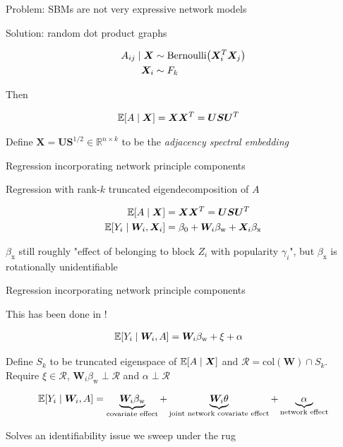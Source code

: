 \documentclass{beamer}
\theoremstyle{remark}
\newcommand{\X}{\bm X}
\newcommand{\W}{\bm W}
\newcommand{\Spop}{\bm S}
\newcommand{\Upop}{\bm U}
\newcommand{\betazero}{\beta_0}
\newcommand \cond {\mid}
\newcommand \dist {\sim}
\DeclarePairedDelimiter{\paren}{(}{)}
\DeclarePairedDelimiter{\brac}{[}{]}
\newcommand{\E}[2][]{%
   \ifthenelse{ \equal{#1}{} }
      {\ensuremath{\mathbb{E} \brac*{#2}}}
      {\ensuremath{\mathbb{E} \brac*{#2 \mid #1}}}
}
\begin{document}
\begin{frame}{Problem: SBMs are not very expressive network models}

    Solution: random dot product graphs

    \begin{align*}
        A_{ij} \cond \X & \dist \mathrm{Bernoulli} \paren*{\X_i^T \X_j} \\
        \X_i            & \dist F_k
    \end{align*}

    Then

    \begin{align*}
        \E[\X]{A} & = \X \X^T = \Upop \Spop \Upop^T
    \end{align*}

    Define $\X = \Upop \Spop^{1/2} \in \mathbb{R}^{n \times k}$ to be the \emph{adjacency spectral embedding}

\end{frame}


\begin{frame}{Regression incorporating network principle components}

    Regression with rank-$k$ truncated eigendecomposition of $A$

    \begin{align*}
        \E[\X]{A}           & = \X \X^T = \Upop \Spop \Upop^T                         \\
        \E[\W_i, \X_i]{Y_i} & = \betazero + \W_i \beta_\text{w} + \X_i \beta_\text{x}
    \end{align*}

    $\beta_\text{x}$ still roughly "effect of belonging to block $Z_i$ with popularity $\gamma_i$", but $\beta_\text{x}$ is rotationally unidentifiable

\end{frame}

\begin{frame}{Regression incorporating network principle components}

    This has been done in \cite{le_linear_2021}!

    \begin{align*}
        \E[\W_i, A]{Y_i} & = \W_i \beta_\text{w} + \xi + \alpha
    \end{align*}

    Define $S_k$ to be truncated eigenspace of $\E[\X]{A}$ and  $\mathcal R = \mathrm{col}(\W) \cap S_k$. Require $\xi \in \mathcal R$, $\W_i \beta_\text{w} \perp \mathcal R$ and $\alpha \perp \mathcal R$

    \begin{align*}
        \E[\W_i, A]{Y_i} =
        \underbrace{\W_i \beta_\text{w}}_\text{covariate effect} +
        \underbrace{\W_i \theta}_\text{joint network covariate effect} +
        \underbrace{\alpha}_\text{network effect}
    \end{align*}

    Solves an identifiability issue we sweep under the rug
\end{frame}
\end{document}
